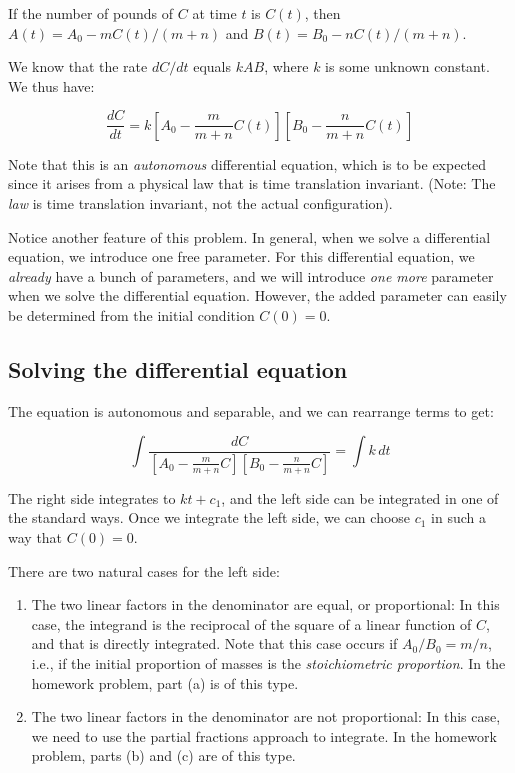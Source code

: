 \documentclass[10pt]{amsart}
\begin{document}
If the number of pounds of $C$ at time $t$ is $C(t)$, then $A(t) = A_0
- mC(t)/(m + n)$ and $B(t) = B_0 - nC(t)/(m + n)$.

We know that the rate $dC/dt$ equals $kAB$, where $k$ is some unknown
constant. We thus have:

$$\frac{dC}{dt} = k\left[A_0 - \frac{m}{m + n}C(t) \right]\left[B_0 - \frac{n}{m + n}C(t) \right]$$

Note that this is an {\em autonomous} differential equation, which is
to be expected since it arises from a physical law that is time
translation invariant. (Note: The {\em law} is time translation
invariant, not the actual configuration).

Notice another feature of this problem. In general, when we solve a
differential equation, we introduce one free parameter. For this
differential equation, we {\em already} have a bunch of parameters,
and we will introduce {\em one more} parameter when we solve the
differential equation. However, the added parameter can easily be
determined from the initial condition $C(0) = 0$.
\subsection{Solving the differential equation}

The equation is autonomous and separable, and we can rearrange terms to get:

$$\int \frac{dC}{\left[A_0 - \frac{m}{m + n}C \right]\left[B_0 - \frac{n}{m + n}C \right]} = \int k \, dt$$

The right side integrates to $kt + c_1$, and the left side can be
integrated in one of the standard ways. Once we integrate the left
side, we can choose $c_1$ in such a way that $C(0) = 0$.

There are two natural cases for the left side:

\begin{enumerate}
\item The two linear factors in the denominator are equal, or
  proportional: In this case, the integrand is the reciprocal of the
  square of a linear function of $C$, and that is directly
  integrated. Note that this case occurs if $A_0/B_0 = m/n$, i.e., if
  the initial proportion of masses is the {\em stoichiometric
  proportion}. In the homework problem, part (a) is of this type.
\item The two linear factors in the denominator are not proportional:
  In this case, we need to use the partial fractions approach to
  integrate. In the homework problem, parts (b) and (c) are of this type.
\end{enumerate}
\end{document}
